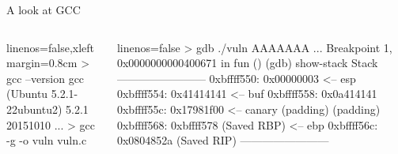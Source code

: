 \documentclass[beamer]{uibk}
\begin{document}
\begin{frame}[fragile]{A look at GCC}
    \begin{columns}
        \begin{column}{0.5\textwidth}
            \begin{code*}{linenos=false,xleftmargin=0.8cm}
                > gcc --version
                gcc (Ubuntu 5.2.1-22ubuntu2) 5.2.1 20151010
                  ...
                > gcc -g -o vuln vuln.c
            \end{code*}
        \end{column}
        \pause
        \begin{column}{0.5\textwidth}
            \begin{code*}{linenos=false}
                > gdb ./vuln
                AAAAAAA
                  ...
                Breakpoint 1, 0x0000000000400671 in fun ()
                (gdb) show-stack
                Stack
                ------------------------
                0xbffff550: 0x00000003             <-- esp
                0xbffff554: 0x41414141             <-- buf
                0xbffff558: 0x0a414141
                0xbffff55c: 0x17981f00             <-- canary
                       (padding)
                       (padding)
                0xbffff568: 0xbffff578 (Saved RBP) <-- ebp
                0xbffff56c: 0x0804852a (Saved RIP)
                ------------------------
            \end{code*}
        \end{column}
    \end{columns}
\end{frame}
\end{document}
